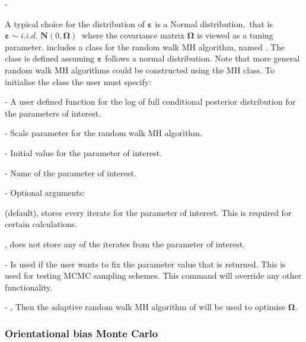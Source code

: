 -\documentclass[article]{jss}
\begin{document}
A typical choice for the distribution of $\bm{\bm{\varepsilon}}$ is a
Normal distribution,\emph{\ }that is $\bm{\varepsilon\sim}i.i.d.$
$\bm{N}\left(0,\bm{\Omega}\right)\ $ where the covariance matrix
$\bm{\Omega}$ is viewed as a tuning parameter.  includes a
class for the random walk MH algorithm, named . The class
 is defined assuming $\bm{\varepsilon}$ follows a normal
distribution. Note that more general random walk MH algorithms could
be constructed using the MH class. To initialise the class the user
must specify:
\begin{description}
\item {} - A user defined function for the log of full
  conditional posterior distribution for the parameters of interest.
\item {} - Scale parameter for the random walk MH algorithm.
\item {} - Initial value for the parameter of interest.
\item {} - Name of the parameter of interest.
\item {} - Optional arguments:

  \begin{description}
  \item {}
    \begin{description}
    \item {} (default), stores every iterate for the
      parameter of interest. This is required for certain
      calculations.
    \item {}, does not store any of the iterates from the
      parameter of interest.
    \end{description}
  \item {} - Is used if the user wants to fix the
    parameter value that is returned. This is used for testing MCMC
    sampling schemes.  This command will override any other
    functionality.
  \item {} - , Then the adaptive random walk
    MH algorithm of \citet{GarthwaiteYanScisson2010} will be used to
    optimise $\bm{\Omega}.$
  \end{description}
\end{description}

\subsubsection{Orientational bias Monte Carlo}
\end{document}
